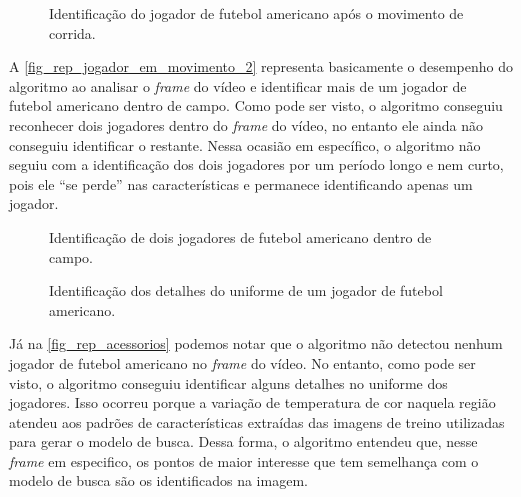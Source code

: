 \begin{figure}[ht]
	\caption{\label{fig_rep_jogador_em_movimento_2}Identificação do jogador de futebol americano após o movimento de corrida.}
	\begin{center}
	\end{center}
	\centering {}
\end{figure}


A \autoref{fig_rep_jogador_em_movimento_2} representa basicamente o desempenho do algoritmo ao analisar o \textit{frame} do vídeo e identificar mais de um jogador de futebol americano dentro de campo. Como pode ser visto, o algoritmo conseguiu reconhecer dois jogadores dentro do \textit{frame} do vídeo, no entanto ele ainda não conseguiu identificar o restante. Nessa ocasião em específico, o algoritmo não seguiu com a identificação dos dois jogadores por um período longo e nem curto, pois ele “se perde” nas características e permanece identificando apenas um jogador.

\begin{figure}[ht]
	\caption{\label{fig_rep_jogador_em_movimento_2}Identificação de dois jogadores de futebol americano dentro de campo.}
	\begin{center}
	\end{center}
	\centering {}
\end{figure}


\begin{figure}[ht]
	\caption{\label{fig_rep_acessorios}Identificação dos detalhes do uniforme de um jogador de futebol americano.}
	\begin{center}
	\end{center}
	\centering {}
\end{figure}

Já na \autoref{fig_rep_acessorios} podemos notar que o algoritmo não detectou nenhum jogador de futebol americano no \textit{frame} do vídeo. No entanto, como pode ser visto, o algoritmo conseguiu identificar alguns detalhes no uniforme dos jogadores. Isso ocorreu porque a variação de temperatura de cor naquela região atendeu aos padrões de características extraídas das imagens de treino utilizadas para gerar o modelo de busca. Dessa forma, o algoritmo entendeu que, nesse \textit{frame} em especifico, os pontos de maior interesse que tem semelhança com o modelo de busca são os identificados na imagem.

